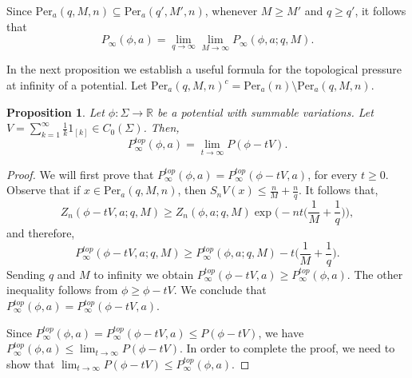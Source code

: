 \documentclass[letterpaper,11pt]{amsart}
\theoremstyle{plain}
\theoremstyle{plain}
\newtheorem{proposition}{Proposition}[subsection]
\theoremstyle{definition}
\theoremstyle{remark}
\def\R{{\mathbb R}}
\begin{document}
Since $\text{Per}_a(q,M,n)\subseteq \text{Per}_a(q',M',n)$, whenever $M\ge M'$ and $q\ge q'$, it follows that
$$P_\infty(\phi,a)=\lim_{q\to\infty}\lim_{M\to\infty} P_\infty(\phi,a;q,M).$$

In the next proposition we establish a useful formula for the topological pressure at infinity of a potential. Let $\text{Per}_a(q,M,n)^c=\text{Per}_a(n)\setminus \text{Per}_a(q,M,n).$ 

\begin{proposition}\label{inf} Let $\phi:\Sigma\to\R$ be a potential with summable variations. Let $V=\sum_{k=1}^\infty \frac{1}{k} 1_{[k]}\in C_0(\Sigma)$. Then, $$P^{top}_\infty(\phi,a)=\lim_{t\to\infty} P(\phi-tV).$$
\end{proposition}
\begin{proof} We will first prove that $P^{top}_\infty(\phi,a)=P^{top}_\infty(\phi-tV,a)$, for every $t\ge 0$. Observe that if $x\in \text{Per}_a(q,M,n)$, then $S_nV(x)\le \frac{n}{M}+\frac{n}{q}$. It follows that,
$$Z_n(\phi-tV,a;q,M)\ge Z_n(\phi,a;q,M)\exp\bigg(-nt\bigg(\frac{1}{M}+\frac{1}{q}\bigg)\bigg),$$
and therefore,
$$P^{top}_\infty(\phi-tV,a;q,M)\ge P^{top}_\infty(\phi,a;q,M)-t\bigg(\frac{1}{M}+\frac{1}{q}\bigg).$$
Sending $q$ and $M$ to infinity we obtain $P^{top}_\infty(\phi-tV,a)\ge P^{top}_\infty(\phi,a)$. The other inequality follows from $\phi\ge \phi-tV$. We conclude that $P_\infty^{top}(\phi,a)=P_\infty^{top}(\phi-tV,a)$. 

Since $P^{top}_\infty(\phi,a)=P^{top}_\infty(\phi-tV,a)\le P(\phi-tV)$, we have $P^{top}_\infty(\phi,a)\le \lim_{t\to\infty}P(\phi-tV)$. In order to complete the proof, we need to show that  $\lim_{t\to\infty}P(\phi-tV)\le P^{top}_\infty(\phi,a)$. 


\end{proof}
\end{document}
